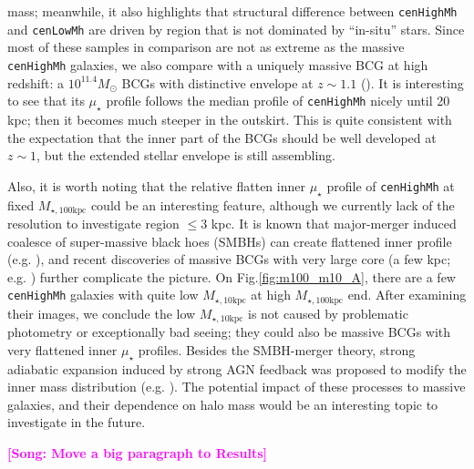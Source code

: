 \documentclass{emulateapj}
\def\rbcg{\texttt{cenHighMh}}
\def\nbcg{\texttt{cenLowMh}}
\def\minn{{$M_{\star,10\mathrm{kpc}}$}}
\def\mtot{{$M_{\star,100\mathrm{kpc}}$}}
\def\mden{{$\mu_{\star}$}}
\newcommand{\song}[1]{\textcolor{magenta}{\textbf{[Song: #1]}}}
\begin{document}
\begin{CJK*}{UTF8}{gbsn}
    mass; meanwhile, it also highlights that structural difference between \rbcg{} and 
    \nbcg{} are driven by region that is not dominated by ``in-situ'' stars. 
    Since most of these samples in comparison are not as extreme as the massive 
    \rbcg{} galaxies, we also compare with a uniquely massive BCG at high redshift: 
    a $10^{11.4} M_{\odot}$ BCGs with distinctive envelope at $z\sim 1.1$ 
    (\citealt{Liu2013}).  
    It is interesting to see that its \mden{} profile follows the median profile of 
    \rbcg{} nicely until 20 kpc; then it becomes much steeper in the outskirt.  
    This is quite consistent with the expectation that the inner part of the BCGs 
    should be well developed at $z\sim 1$, but the extended stellar envelope is still 
    assembling.  
    
    Also, it is worth noting that the relative flatten inner \mden{} profile of \rbcg{}
    at fixed \mtot{} could be an interesting feature, although we currently lack of the 
    resolution to investigate region $\leq 3$ kpc.  
    It is known that major-merger induced coalesce of super-massive black hoes (SMBHs)
    can create flattened inner profile (e.g. \citealt{Milosavljevi2002}), and recent 
    discoveries of massive BCGs with very large core 
    (a few kpc; e.g. \citealt{Postman2012, LopezCruz2014}) further complicate the picture.
    On Fig.\ref{fig:m100_m10_A}, there are a few \rbcg{} galaxies with quite low 
    \minn{} at high \mtot{} end. 
    After examining their images, we conclude the low \minn{} is not caused by problematic
    photometry or exceptionally bad seeing; they could also be massive BCGs with very 
    flattened inner \mden{} profiles.  
    Besides the SMBH-merger theory, strong adiabatic expansion induced by strong AGN 
    feedback was proposed to modify the inner mass distribution (e.g. \citealt{Fan2008}). 
    The potential impact of these processes to massive galaxies, and their dependence on 
    halo mass would be an interesting topic to investigate in the future.  
    
    \song{Move a big paragraph to Results} 
    

\end{CJK*}
\end{document}
